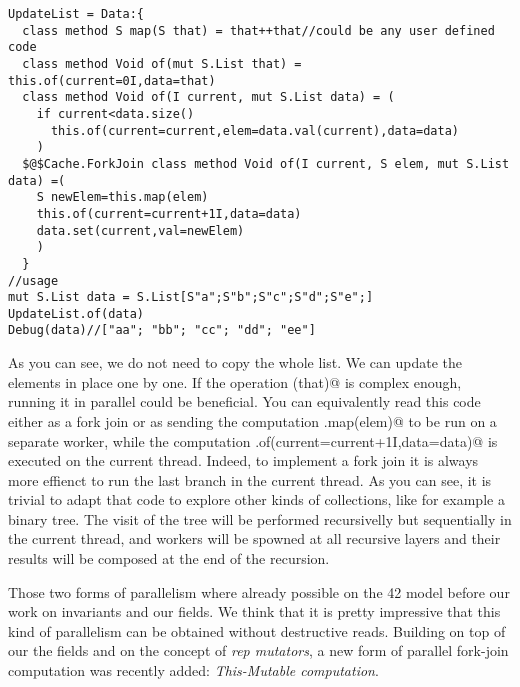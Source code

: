 \begin{lstlisting}[deletekeywords=label]
UpdateList = Data:{
  class method S map(S that) = that++that//could be any user defined code
  class method Void of(mut S.List that) = this.of(current=0I,data=that)  
  class method Void of(I current, mut S.List data) = (
    if current<data.size() 
      this.of(current=current,elem=data.val(current),data=data)
    )
  $@$Cache.ForkJoin class method Void of(I current, S elem, mut S.List data) =(
    S newElem=this.map(elem)
    this.of(current=current+1I,data=data)
    data.set(current,val=newElem)
    )
  }
//usage
mut S.List data = S.List[S"a";S"b";S"c";S"d";S"e";]
UpdateList.of(data)
Debug(data)//["aa"; "bb"; "cc"; "dd"; "ee"]
\end{lstlisting}
As you can see, we do not need to copy the whole list. We can update the elements in place one by one.
If the operation \Q@map(that)@ is complex enough, running it in parallel could be beneficial.
You can equivalently read this code either as a fork join or as sending the computation \Q@this.map(elem)@ to be run on a separate worker, while
the computation     \Q@this.of(current=current+1I,data=data)@ is executed on the current thread.
Indeed, to implement a fork join it is always more effienct to run the last branch in the current thread.
As you can see, it is trivial to adapt that code to explore other kinds of collections, like for example a binary tree.
The visit of the tree will be performed recursivelly but sequentially in the current thread, and workers will be spowned at all recursive layers and their results will be composed at the end of the recursion.


Those two forms of parallelism where already possible on the 42 model before our work on invariants and our \Q@rep@ fields.
We think that it is pretty impressive that this kind of parallelism can be obtained without destructive reads.
Building on top of our the \Q@rep@ fields and on the concept of \emph{rep mutators}, a new form of parallel fork-join computation was recently added:
\emph{This-Mutable computation}.

